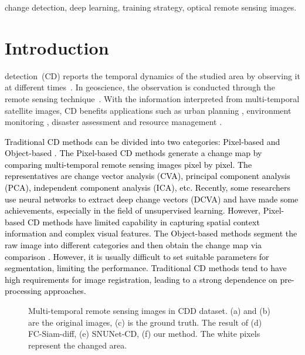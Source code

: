\documentclass[lettersize,journal]{IEEEtran}
\newcommand{\edita}[1]{\textcolor{black}{#1}}
\begin{document}
\begin{IEEEkeywords}
change detection, deep learning, training strategy, optical remote sensing images.
\end{IEEEkeywords}

\section{Introduction}
 detection~(CD) reports the temporal dynamics of the studied area by observing it at different times~\cite{singh1989review}. In geoscience, the observation is conducted through the remote sensing technique~\cite{yang2021da2net,li2020amn}. With the information interpreted from multi-temporal satellite images, CD benefits applications such as urban planning \cite{ji2018fully}, environment monitoring \cite{masek2015role,reba2020systematic,sippel2020climate}, disaster assessment \cite{lei2019landslide,ma2016automatic,peng2020optical,doroodgar2014learning} and resource management \cite{sim2006grid}.

\edita{Traditional CD methods can be divided into two categories: Pixel-based and Object-based \cite{hussain2013change}.
The Pixel-based CD methods generate a change map by comparing multi-temporal remote sensing images pixel by pixel.
The representatives are change vector analysis (CVA)\cite{lambin1994change}, principal component analysis (PCA)\cite{celik2009unsupervised}, independent component analysis (ICA)\cite{marchesi2009ica}, etc.
Recently, some researchers use neural networks to extract deep change vectors (DCVA)\cite{saha2019unsupervised,saha2020unsupervised,saha2020building} and have made some achievements, especially in the field of unsupervised learning.
However, Pixel-based CD methods have limited capability in capturing spatial context information and complex visual features.
The Object-based methods segment the raw image into different categories and then obtain the change map via comparison \cite{castilla2008image}.
However, it is usually difficult to set suitable parameters for segmentation, limiting the performance.
Traditional CD methods tend to have high requirements for image registration, leading to a strong dependence on pre-processing approaches.}

\begin{figure}[t]
\centering
{}

\caption{Multi-temporal remote sensing images in CDD dataset.
(a) and (b) are the original images, (c) is the ground truth.
The result of (d) FC-Siam-diff, (e) SNUNet-CD, (f) our method.
The white pixels represent the changed area.}
\label{image1}
\end{figure}
\end{document}
